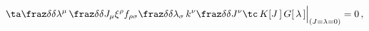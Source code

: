 \begin{equation}
\ta \fraz\delta{\delta\lambda^\mu}\,\fraz\delta{\delta
J_\mu}\xi^\rho
f_{\rho\sigma}\fraz\delta{\delta\lambda_\sigma}\,k^\nu\fraz\delta
{\delta J^\nu} \tc\,K[J\,]\,G[\,\lambda\,]\Bigr|_{(J=\lambda=0)}
=0\,,
\end{equation}


